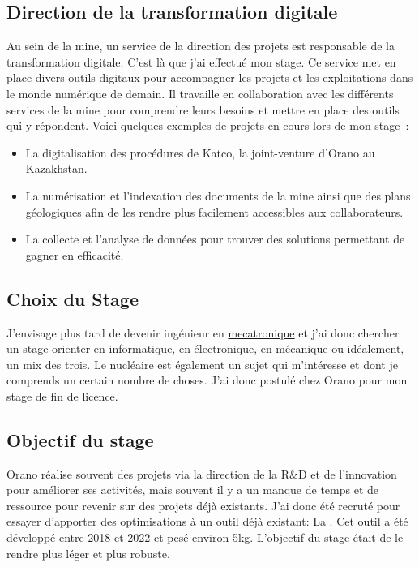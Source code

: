 \subsection{Direction de la transformation digitale}
Au sein de la mine, un service de la direction des projets est responsable de la transformation digitale. C'est là que j'ai effectué mon stage. Ce service met en place divers outils digitaux pour accompagner les projets et les exploitations dans le monde numérique de demain. Il travaille en collaboration avec les différents services de la mine pour comprendre leurs besoins et mettre en place des outils qui y répondent. Voici quelques exemples de projets en cours lors de mon stage~:



\begin{itemize}
    \item La digitalisation des procédures de Katco, la joint-venture d'Orano au Kazakhstan.
    \item La numérisation et l'indexation des documents de la mine ainsi que des plans géologiques afin de les rendre plus facilement accessibles aux collaborateurs.
    \item La collecte et l'analyse de données pour trouver des solutions permettant de gagner en efficacité.
\end{itemize}


\subsection{Choix du Stage}
J'envisage plus tard de devenir ingénieur en \href{https://fr.wikipedia.org/wiki/M%C3%A9catronique}{mecatronique} et j'ai donc chercher un stage orienter en informatique, en électronique, en mécanique ou idéalement, un mix des trois. Le nucléaire est également un sujet qui m'intéresse et dont je comprends un certain nombre de choses. J'ai donc postulé chez Orano pour mon stage de fin de licence. %
\subsection{Objectif du stage}

Orano réalise souvent des projets via la direction de la R\&D et de l'innovation pour améliorer ses activités, mais souvent il y a un manque de temps et de ressource pour revenir sur des projets déjà existants. J'ai donc été recruté pour essayer d'apporter des optimisations à un outil déjà existant: La . Cet outil a été développé entre 2018 et 2022 et pesé environ 5kg. L'objectif du stage était de le rendre plus léger et plus robuste.